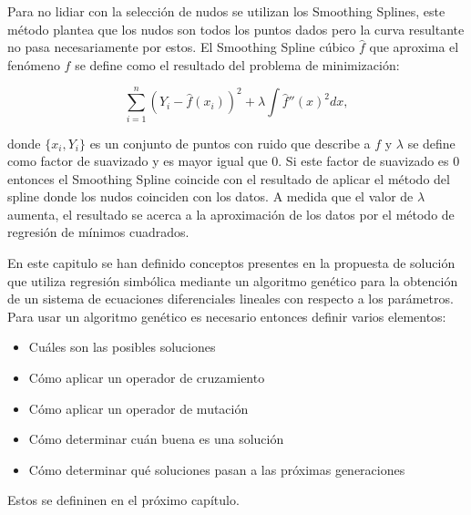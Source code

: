 Para no lidiar con la selección de nudos se utilizan los Smoothing Splines, este método plantea que los nudos son todos los puntos dados pero la curva resultante no pasa necesariamente por estos. El Smoothing Spline cúbico $\hat{f}$ que aproxima el fenómeno $f$ se define como el resultado del problema de minimización:

$$\sum_{i=1}^n (Y_i - \hat{f}(x_i))^2 + \lambda \int \hat{f}''(x)^2 dx,$$

donde $\{x_i, Y_i\}$ es un conjunto de puntos con ruido que describe a $f$ y $\lambda$ se define como factor de suavizado y es mayor igual que 0. Si este factor de suavizado es 0 entonces el Smoothing Spline coincide con el resultado de aplicar el método del spline donde los nudos coinciden con los datos. A medida que el valor de $\lambda$ aumenta, el resultado se acerca a la aproximación de los datos por el método de regresión de mínimos cuadrados.


En este capitulo se han definido conceptos presentes en la propuesta de solución que utiliza regresión simbólica mediante un algoritmo genético para la obtención de un sistema de ecuaciones diferenciales lineales con respecto a los parámetros. Para usar un algoritmo genético es necesario entonces definir varios elementos:

\begin{itemize}
    \item Cuáles son las posibles soluciones
    \item Cómo aplicar un operador de cruzamiento
    \item Cómo aplicar un operador de mutación
    \item Cómo determinar cuán buena es una solución
    \item Cómo determinar qué soluciones pasan a las próximas generaciones
\end{itemize}

Estos se defininen en el próximo capítulo.
